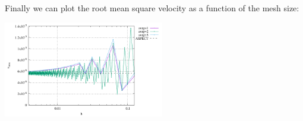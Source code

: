 Finally we can plot the root mean square velocity as a function 
of the mesh size:
\begin{center}
\includegraphics[width=7cm]{python_codes/fieldstone_158/results/exp5/vrms.pdf}
\end{center} 



